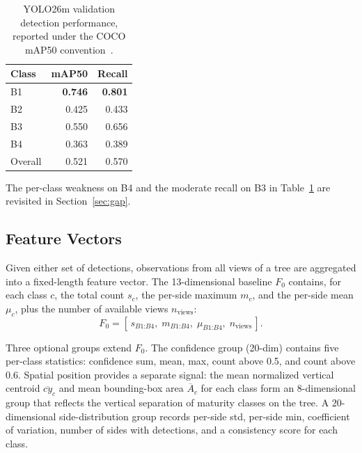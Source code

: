 ﻿\documentclass[conference]{IEEEtran}
\begin{document}
\begin{table}[!htbp]
  \centering
  \footnotesize
  \setlength{\tabcolsep}{4pt}
  \caption{YOLO26m validation detection performance, reported under the
    COCO mAP50 convention~\cite{ref16}.}
  \label{tab:yolo}
  \begin{tabular}{@{}lrr@{}}
    \toprule
    Class   & mAP50          & Recall         \\
    \midrule
    B1      & \textbf{0.746} & \textbf{0.801} \\
    B2      & 0.425          & 0.433          \\
    B3      & 0.550          & 0.656          \\
    B4      & 0.363          & 0.389          \\
    Overall & 0.521          & 0.570          \\
    \bottomrule
  \end{tabular}
\end{table}

The per-class weakness on B4 and the moderate recall on B3 in
Table~\ref{tab:yolo} are revisited in Section~\ref{sec:gap}.

\subsection{Feature Vectors}

Given either set of detections, observations from all views of a tree are
aggregated into a fixed-length feature vector. The 13-dimensional baseline
$F_0$ contains, for each class $c$, the total count $s_c$, the per-side
maximum $m_c$, and the per-side mean $\mu_c$, plus the number of available
views $n_{\text{views}}$:
\begin{equation}
  F_0 = [\,s_{B1\text{:}B4},\;m_{B1\text{:}B4},\;\mu_{B1\text{:}B4},\;
        n_{\text{views}}\,].
\end{equation}

Three optional groups extend $F_0$. The confidence group (20-dim) contains
five per-class statistics: confidence sum, mean, max, count above 0.5, and
count above 0.6. Spatial position provides a separate signal: the mean
normalized vertical centroid $\overline{cy}_c$ and mean bounding-box area
$\overline{A}_c$ for each class form an 8-dimensional group that reflects the
vertical separation of maturity classes on the tree. A 20-dimensional
side-distribution group records per-side std, per-side min, coefficient of
variation, number of sides with detections, and a consistency score for each
class.
\end{document}
